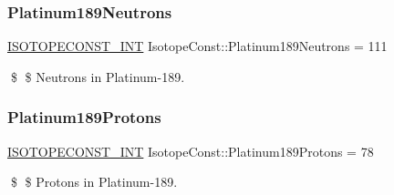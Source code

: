 \subsubsection{\texorpdfstring{Platinum189\+Neutrons}{Platinum189Neutrons}}
{\footnotesize\ttfamily \mbox{\hyperlink{group___isotope_const-_macros_ga5f18360b3e99483a35c32d789e62621c}{I\+S\+O\+T\+O\+P\+E\+C\+O\+N\+S\+T\+\_\+\+I\+NT}} Isotope\+Const\+::\+Platinum189\+Neutrons = 111}

\$ \$ Neutrons in Platinum-\/189. \mbox{\label{group___isotope_const-_platinum-_pt189_gaa0b6ca5a363b9dccfecc9752b24f0b17}} 
\subsubsection{\texorpdfstring{Platinum189\+Protons}{Platinum189Protons}}
{\footnotesize\ttfamily \mbox{\hyperlink{group___isotope_const-_macros_ga5f18360b3e99483a35c32d789e62621c}{I\+S\+O\+T\+O\+P\+E\+C\+O\+N\+S\+T\+\_\+\+I\+NT}} Isotope\+Const\+::\+Platinum189\+Protons = 78}

\$ \$ Protons in Platinum-\/189. 